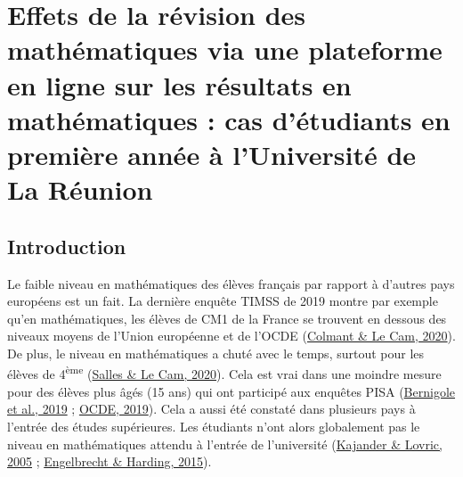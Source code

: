\documentclass[
]{book}
\begin{document}
\hypertarget{g20}{%
\chapter{Effets de la révision des mathématiques via une plateforme en ligne sur les résultats en mathématiques : cas d'étudiants en première année à l'Université de La Réunion}\label{g20}}


\newpage

\hypertarget{g20intro}{%
\section{Introduction}\label{g20intro}}

Le faible niveau en mathématiques des élèves français par rapport à d'autres pays européens est un fait. La dernière enquête TIMSS de 2019 montre par exemple qu'en mathématiques, les élèves de CM1 de la France se trouvent en dessous des niveaux moyens de l'Union européenne et de l'OCDE (\protect\hyperlink{ref-COL:LEC:20}{Colmant \& Le Cam, 2020}). De plus, le niveau en mathématiques a chuté avec le temps, surtout pour les élèves de 4\textsuperscript{ème} (\protect\hyperlink{ref-SAL:LEC:20}{Salles \& Le Cam, 2020}). Cela est vrai dans une moindre mesure pour des élèves plus âgés (15 ans) qui ont participé aux enquêtes PISA (\protect\hyperlink{ref-BER:eal:19}{Bernigole et al., 2019} ; \protect\hyperlink{ref-OCD:19}{OCDE, 2019}). Cela a aussi été constaté dans plusieurs pays à l'entrée des études supérieures. Les étudiants n'ont alors globalement pas le niveau en mathématiques attendu à l'entrée de l'université (\protect\hyperlink{ref-KAJ:LOV:05}{Kajander \& Lovric, 2005} ; \protect\hyperlink{ref-ENG:eal:15}{Engelbrecht \& Harding, 2015}).
\end{document}
